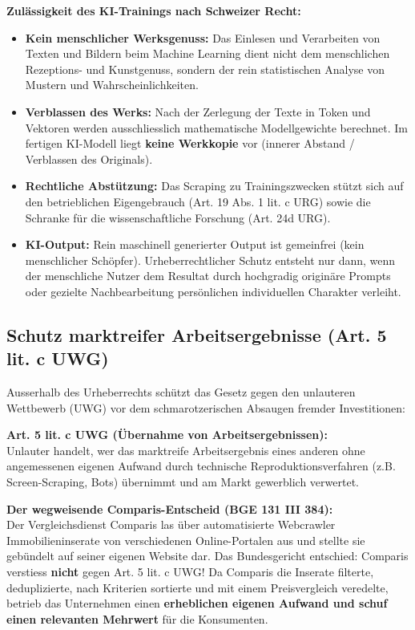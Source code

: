 \begin{theorem}
    \textbf{Zulässigkeit des KI-Trainings nach Schweizer Recht:}
    \begin{itemize}
        \item \textbf{Kein menschlicher Werksgenuss:} Das Einlesen und Verarbeiten von Texten und Bildern beim Machine Learning dient nicht dem menschlichen Rezeptions- und Kunstgenuss, sondern der rein statistischen Analyse von Mustern und Wahrscheinlichkeiten.
        \item \textbf{Verblassen des Werks:} Nach der Zerlegung der Texte in Token und Vektoren werden ausschliesslich mathematische Modellgewichte berechnet. Im fertigen KI-Modell liegt \textbf{keine Werkkopie} vor (innerer Abstand / Verblassen des Originals).
        \item \textbf{Rechtliche Abstützung:} Das Scraping zu Trainingszwecken stützt sich auf den betrieblichen Eigengebrauch (Art. 19 Abs. 1 lit. c URG) sowie die Schranke für die wissenschaftliche Forschung (Art. 24d URG).
        \item \textbf{KI-Output:} Rein maschinell generierter Output ist gemeinfrei (kein menschlicher Schöpfer). Urheberrechtlicher Schutz entsteht nur dann, wenn der menschliche Nutzer dem Resultat durch hochgradig originäre Prompts oder gezielte Nachbearbeitung persönlichen individuellen Charakter verleiht.
    \end{itemize}
\end{theorem}

\subsection{Schutz marktreifer Arbeitsergebnisse (Art. 5 lit. c UWG)}

Ausserhalb des Urheberrechts schützt das Gesetz gegen den unlauteren Wettbewerb (UWG) vor dem schmarotzerischen Absaugen fremder Investitionen:

\begin{definition}
    \textbf{Art. 5 lit. c UWG (Übernahme von Arbeitsergebnissen):} \\
    Unlauter handelt, wer das marktreife Arbeitsergebnis eines anderen ohne angemessenen eigenen Aufwand durch technische Reproduktionsverfahren (z.B. Screen-Scraping, Bots) übernimmt und am Markt gewerblich verwertet.
\end{definition}

\begin{example}
    \textbf{Der wegweisende Comparis-Entscheid (BGE 131 III 384):} \\
    Der Vergleichsdienst Comparis las über automatisierte Webcrawler Immobilieninserate von verschiedenen Online-Portalen aus und stellte sie gebündelt auf seiner eigenen Website dar. Das Bundesgericht entschied: Comparis verstiess \textbf{nicht} gegen Art. 5 lit. c UWG! Da Comparis die Inserate filterte, deduplizierte, nach Kriterien sortierte und mit einem Preisvergleich veredelte, betrieb das Unternehmen einen \textbf{erheblichen eigenen Aufwand und schuf einen relevanten Mehrwert} für die Konsumenten.
\end{example}

